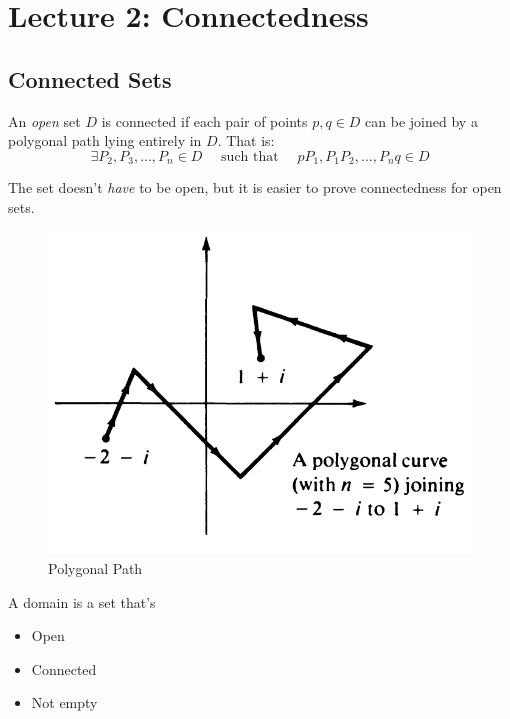 \chapter{Lecture 2: Connectedness}
\section{Connected Sets}
\begin{definition}
    An \textit{open} set $D$ is connected if each pair of points $p, q \in D$ can be joined by a polygonal path lying entirely in $D$. That is:
    \[
        \exists P_2, P_3, \ldots, P_n \in D\quad  \text{ such that }\quad  pP_1, P_1P_2, \ldots, P_nq \in D\]
\end{definition}

\begin{remark}
    The set doesn't \textit{have} to be open, but it is easier to prove connectedness for open sets.
\end{remark}

\begin{figure}[H]
    \centering
    \includegraphics[scale=0.5]{LECTURE_2/poly.png}
    \caption{Polygonal Path}
    \label{fig:poly}
\end{figure}

\begin{definition}
    [Domain]
    A domain is a set that's
    \begin{itemize}
        \item Open
        \item Connected
        \item Not empty
    \end{itemize}
\end{definition}

